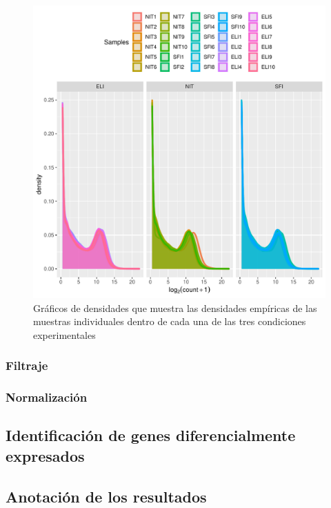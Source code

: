 \documentclass[
  english,
]{article}
\begin{document}
\begin{figure}
\centering
\includegraphics{ortega_rita_ADO_PEC2_files/figure-latex/histogramas de medias-1.pdf}
\caption{Gráficos de densidades que muestra las densidades empíricas de
las muestras individuales dentro de cada una de las tres condiciones
experimentales}
\end{figure}

\hypertarget{filtraje}{%
\subsubsection{Filtraje}\label{filtraje}}

\hypertarget{normalizaciuxf3n}{%
\subsubsection{Normalización}\label{normalizaciuxf3n}}

\hypertarget{identificaciuxf3n-de-genes-diferencialmente-expresados}{%
\subsection{Identificación de genes diferencialmente
expresados}\label{identificaciuxf3n-de-genes-diferencialmente-expresados}}

\hypertarget{anotaciuxf3n-de-los-resultados}{%
\subsection{Anotación de los
resultados}\label{anotaciuxf3n-de-los-resultados}}
\end{document}
